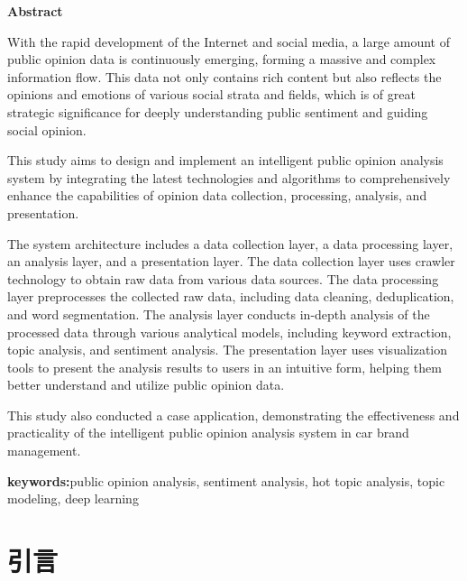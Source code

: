 \documentclass[UTF8,a4paper,15pt,titlepage,oneside]{ctexbook}
\begin{document}
\begin{titlepage}
  \vspace*{2cm}
  \begin{center}
    \textbf{Abstract}

        

        \vspace{0.1cm}
        \end{center}

        With the rapid development of the Internet and social media, a large amount of public opinion data is continuously emerging, forming a massive and complex information flow. This data not only contains rich content but also reflects the opinions and emotions of various social strata and fields, which is of great strategic significance for deeply understanding public sentiment and guiding social opinion. 
        
        This study aims to design and implement an intelligent public opinion analysis system by integrating the latest technologies and algorithms to comprehensively enhance the capabilities of opinion data collection, processing, analysis, and presentation. 
        
        The system architecture includes a data collection layer, a data processing layer, an analysis layer, and a presentation layer. The data collection layer uses crawler technology to obtain raw data from various data sources. The data processing layer preprocesses the collected raw data, including data cleaning, deduplication, and word segmentation. The analysis layer conducts in-depth analysis of the processed data through various analytical models, including keyword extraction, topic analysis, and sentiment analysis. The presentation layer uses visualization tools to present the analysis results to users in an intuitive form, helping them better understand and utilize public opinion data. 
        
        This study also conducted a case application, demonstrating the effectiveness and practicality of the intelligent public opinion analysis system in car brand management.

\vspace{1cm}
\noindent
\textbf{keywords:}\;\;public opinion analysis, sentiment analysis, hot topic analysis, topic modeling, deep learning



\end{titlepage}
\clearpage
\tableofcontents
\clearpage
\section{引言}
\end{document}
